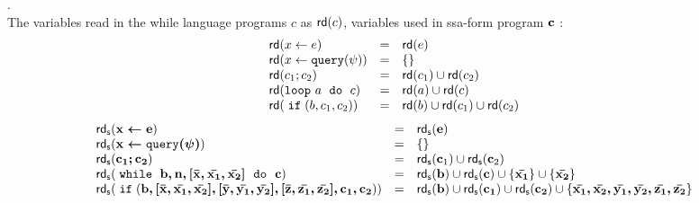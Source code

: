 \documentclass[a4paper,11pt]{article}
\begin{document}
\begin{defn}.
\\
{
The variables read in the while language programs $c$ as $\mathsf{rd} (c)$, variables used in ssa-form program ${\boldsymbol{\mathbf{c}}}$ : 
}
\[
\begin{array}{lll}
    \mathsf{rd} (\mathrel{ x \leftarrow e }) & =& \mathsf{rd} (e)  \\
    \mathsf{rd} (\mathrel{ x \leftarrow {\tt query}(\psi) }) & =&\{  \} \\
    \mathsf{rd} ( c_1; c_2  )  & = & \mathsf{rd} (c_1) \cup \mathsf{rd} (c_2) \\
    \mathsf{rd} (  \mathtt{loop} ~ a ~ \;\mathtt{do}\; ~ c  ) &= &\mathsf{rd} (a) \cup \mathsf{rd} (c) \\
    \mathsf{rd} (\;\mathtt{if}\;(b, c_1, c_2)) & =& \mathsf{rd} (b) \cup \mathsf{rd} (c_1) \cup \mathsf{rd} (c_2)\\
\end{array}
\]
\[
\begin{array}{lll}
    \mathsf{rd_s} ({\boldsymbol{\mathbf{\mathrel{ x \leftarrow e }}}}) & =& \mathsf{rd_s} ({\boldsymbol{\mathbf{e}}})  \\
    \mathsf{rd_s} ({\boldsymbol{\mathbf{\mathrel{ x \leftarrow {\tt query}(\psi) }}}}) & =& \{  \} \\
    \mathsf{rd_s} ( {\boldsymbol{\mathbf{c_1; c_2}}}  )  & = & \mathsf{rd_s} ({\boldsymbol{\mathbf{c}}}_1) \cup \mathsf{rd_s} ({\boldsymbol{\mathbf{c}}}_2) \\
    {\mathsf{rd_s} (  \;\mathtt{while}\; ~ {\boldsymbol{\mathbf{b, n, [\bar{x}, \bar{x_1}, \bar{x_2}] ~ \;\mathtt{do}\; ~ c}}} )} 
    &= &
    \mathsf{rd_s} ({\boldsymbol{\mathbf{b}}}) \cup \mathsf{rd_s} ({\boldsymbol{\mathbf{c}}})  \cup \{ {\boldsymbol{\mathbf{\bar{x_1}}}} \} \cup \{ {\boldsymbol{\mathbf{\bar{x_2}}}} \}\\
    \mathsf{rd_s} (\;\mathtt{if}\;({\boldsymbol{\mathbf{b,[\bar{x}, \bar{x_1}, \bar{x_2}], [\bar{y}, \bar{y_1}, \bar{y_2}],[\bar{z}, \bar{z_1}, \bar{z_2}], c_1, c_2}}} )) & =& \mathsf{rd_s} ({\boldsymbol{\mathbf{b}}}) \cup \mathsf{rd_s} ({\boldsymbol{\mathbf{c_1}}}) \cup \mathsf{rd_s} ({\boldsymbol{\mathbf{c_2}}}) \cup \{{\boldsymbol{\mathbf{\bar{x_1}, \bar{x_2},\bar{y_1}, \bar{y_2},\bar{z_1}, \bar{z_2} }}}\}  \\
\end{array}
\]
\end{defn}
%
\end{document}
